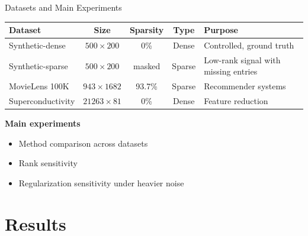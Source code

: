 \documentclass[aspectratio=169,usenames,dvipsnames]{beamer}
\begin{document}
\begin{frame}{Datasets and Main Experiments}
    
    \begin{table}[h]
    \centering
    \renewcommand{\arraystretch}{1.3}
    \small
    \begin{tabular}{|l|c|c|c|l|}
    \hline
    \textbf{Dataset} & \textbf{Size} & \textbf{Sparsity} & \textbf{Type} & \textbf{Purpose} \\
    \hline
    Synthetic-dense & $500 \times 200$ & 0\% & Dense & Controlled, ground truth \\
    \hline
    Synthetic-sparse & $500 \times 200$ & masked & Sparse & Low-rank signal with missing entries \\
    \hline
    MovieLens 100K & $943 \times 1682$ & 93.7\% & Sparse & Recommender systems \\
    \hline
    Superconductivity & $21263 \times 81$ & 0\% & Dense & Feature reduction \\
    \hline
    \end{tabular}
    \end{table}
    
    \vspace{0.25cm}

    \textbf{Main experiments}
    \begin{itemize}
        \item Method comparison across datasets
        \item Rank sensitivity
        \item Regularization sensitivity under heavier noise
    \end{itemize}

\end{frame}


\section{Results}
\end{document}
